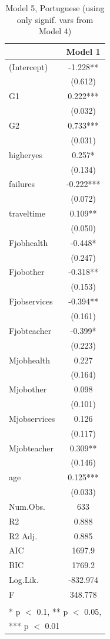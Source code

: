 \documentclass[12pt,english]{article}
\begin{document}
\begin{table}
\caption{Model 5, Portuguese (using only signif. vars from Model 4)}
\label{tab:model5p}
\centering
\begin{tabular}[t]{lc}
\toprule
  & Model 1\\
\midrule
(Intercept) & -1.228**\\
 & (0.612)\\
G1 & 0.222***\\
 & (0.032)\\
G2 & 0.733***\\
 & (0.031)\\
higheryes & 0.257*\\
 & (0.134)\\
failures & -0.222***\\
 & (0.072)\\
traveltime & 0.109**\\
 & (0.050)\\
Fjobhealth & -0.448*\\
 & (0.247)\\
Fjobother & -0.318**\\
 & (0.153)\\
Fjobservices & -0.394**\\
 & (0.161)\\
Fjobteacher & -0.399*\\
 & (0.223)\\
Mjobhealth & 0.227\\
 & (0.164)\\
Mjobother & 0.098\\
 & (0.101)\\
Mjobservices & 0.126\\
 & (0.117)\\
Mjobteacher & 0.309**\\
 & (0.146)\\
age & 0.125***\\
 & (0.033)\\
\midrule
Num.Obs. & 633\\
R2 & 0.888\\
R2 Adj. & 0.885\\
AIC & 1697.9\\
BIC & 1769.2\\
Log.Lik. & -832.974\\
F & 348.778\\
\bottomrule
\multicolumn{2}{l}{\textsuperscript{} * p $<$ 0.1, ** p $<$ 0.05,}\\
\multicolumn{2}{l}{*** p $<$ 0.01}\\
\end{tabular}
\end{table}
\end{document}
